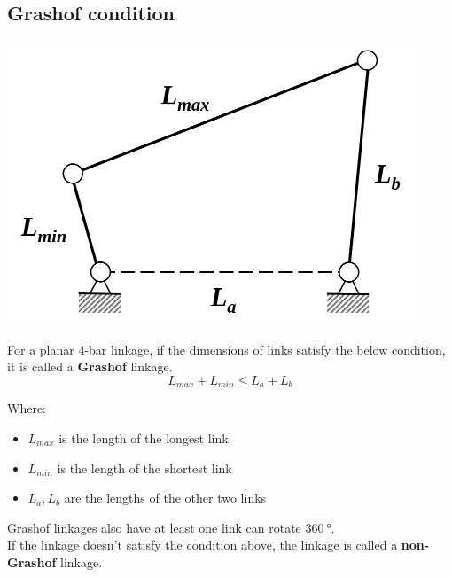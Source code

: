 \documentclass[11pt]{article}
\begin{document}
 \newpage
\subsection{Grashof condition}
\label{sec:orgdbc5794}
\begin{center}
\includegraphics[width=.9\linewidth]{./images/grashof-condition-linkage-image.png}
\end{center}

For a planar 4-bar linkage, if the dimensions of links satisfy the below condition, it is called a \textbf{Grashof} linkage.
\[L_{max} + L_{min} \le L_a + L_b\]

Where:
\begin{itemize}
\item \(L_{max}\) is the length of the longest link
\item \(L_{min}\) is the length of the shortest link
\item \(L_a, L_b\) are the lengths of the other two links  \\
\end{itemize}

Grashof linkages also have at least one link can rotate \(\qty{360}{\degree}\).  \\

If the linkage doesn't satisfy the condition above, the linkage is called a \textbf{non-Grashof} linkage.

 \newpage
\end{document}
